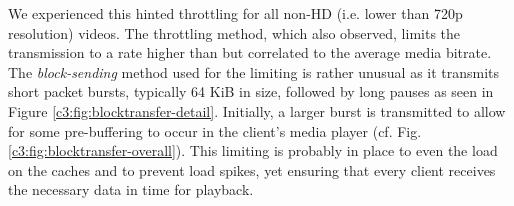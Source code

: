 We experienced this hinted throttling for all non-HD (i.e. lower than 720p resolution) videos. The throttling method, which \cite{alcock2011afcyt} also observed, limits the transmission to a rate higher than but correlated to the average media bitrate. The \textit{block-sending} method used for the limiting is rather unusual as it transmits short packet bursts, typically 64 KiB in size, followed by long pauses as seen in Figure \ref{c3:fig:blocktransfer-detail}. Initially, a larger burst is transmitted to allow for some pre-buffering to occur in the client's media player (cf. Fig. \ref{c3:fig:blocktransfer-overall}). This limiting is probably in place to even the load on the caches and to prevent load spikes, yet ensuring that every client receives the necessary data in time for playback.



